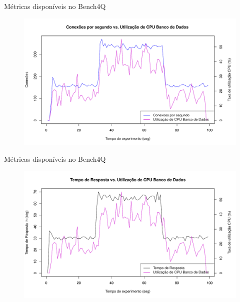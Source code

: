 \begin{frame}{Métricas disponíveis no Bench4Q}
	\begin{figure}[htb]
		\centering
		\includegraphics[scale=0.5]{../monograph/images/cps-dbcpu60.pdf}
		\label{fig:cps-dbcpu60}
	\end{figure}
\end{frame}

\begin{frame}{Métricas disponíveis no Bench4Q}
	\begin{figure}[htb]
		\centering
		\includegraphics[scale=0.5]{../monograph/images/resp-dbcpu60.pdf}
		\label{fig:resp-dbcpu60}
	\end{figure}
\end{frame}




